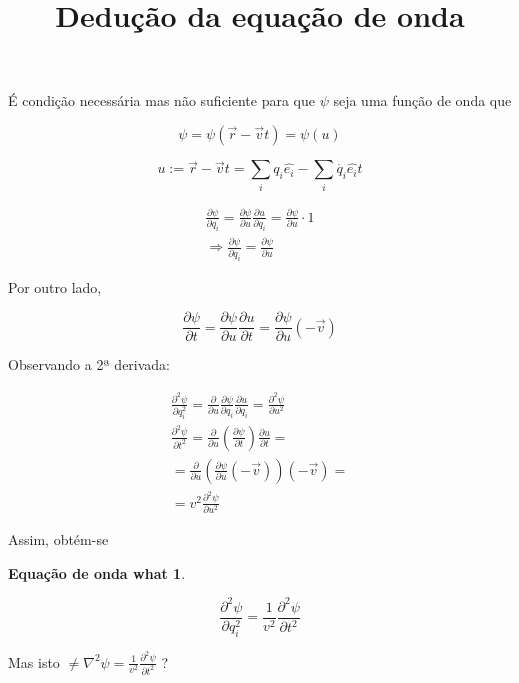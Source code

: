 \documentclass{article}
\title{Dedução da equação de onda}
\author{}
\date{}
\newcommand{\braces}[1]{\left ( #1 \right )}
\newcommand{\dpartial}[2]{\frac{\partial #1}{\partial #2}}
\newcommand{\ddpartial}[2]{\frac{\partial^2 #1}{\partial #2^2}}
\newcommand{\position}[0]{\vec{r}}
\newcommand{\velocity}[0]{\vec{v}}
\newcommand{\versor}[1]{\hat{e_{#1}}}
\newtheorem*{theorem0}{Equação de onda what}
\begin{document}
\maketitle
É condição necessária mas não suficiente para que $\psi$ seja uma função
de onda que

$$\psi = \psi \braces{\position - \velocity t} = \psi \braces{u}$$

$$u := \position - \velocity t = \sum_i q_i \versor{i} - \sum_i \dot{q_i} \versor{i} t$$

\begin{gather*}
\dpartial{\psi}{q_i} = \dpartial{\psi}{u} \dpartial{u}{q_i} = \dpartial{\psi}{u} \cdot 1\\
\Rightarrow \dpartial{\psi}{q_i} = \dpartial{\psi}{u}
\end{gather*}

Por outro lado,

$$ \dpartial{\psi}{t} = \dpartial{\psi}{u} \dpartial{u}{t} = \dpartial{\psi}{u} (- \velocity) $$

Observando a 2ª derivada:

\begin{gather*}
\ddpartial{\psi}{q_i} = \dpartial{}{u} \dpartial{\psi}{q_i} \dpartial{u}{q_i} = \ddpartial{\psi}{u}\\
\ddpartial{\psi}{t} = \dpartial{}{u} \braces{\dpartial{\psi}{t}} \dpartial{u}{t} =\\
= \dpartial{}{u} \braces{\dpartial{\psi}{u} \braces{- \velocity}} \braces{- \velocity} =\\
= v^2 \ddpartial{\psi}{u}
\end{gather*}

Assim, obtém-se

\begin{theorem0}
\begin{center}
$$\ddpartial{\psi}{q_i} = \frac{1}{v^2} \ddpartial{\psi}{t}$$
\end{center}
\end{theorem0}

\vspace{5mm}

Mas isto $\neq \nabla^2 \psi = \frac{1}{v^2} \ddpartial{\psi}{t}$ ?
\end{document}
